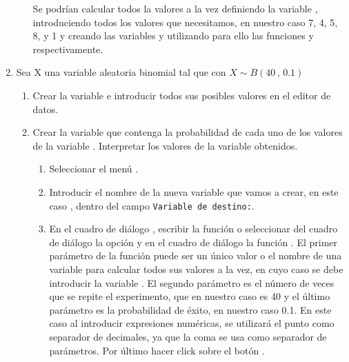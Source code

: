 \begin{enumerate}[leftmargin=*]
\begin{enumerate}
\begin{indicacion}
Se podrían calcular todos la valores a la vez definiendo la
variable , introduciendo todos los valores que
necesitamos, en nuestro caso 7, 4, 5, 8, y 1 y creando las
variables  y 
utilizando para ello las funciones  y 
 respectivamente.
\end{indicacion}

\end{enumerate}

\item Sea X una variable aleatoria binomial tal que con $X\sim B(40\,,\,0.1)$

\begin{enumerate}
\item Crear la variable  e introducir todos sus posibles
valores en el editor de datos.

\item  Crear la variable  que contenga la
probabilidad de cada uno de los valores de la variable .
Interpretar los valores de la variable obtenidos.

\begin{indicacion}
\begin{enumerate}
\item Seleccionar el menú .

\item Introducir el nombre de la nueva variable que vamos a crear,
en este caso , dentro del campo
\texttt{Variable de destino:}.

\item En el cuadro de diálogo ,
escribir la función  o seleccionar del cuadro 
de diálogo  la opción  y en el 
cuadro de diálogo  la 
función . El primer parámetro de la función 
 puede ser
un único valor o el nombre de una variable para calcular todos sus
valores a la vez, en cuyo caso se debe introducir la variable .
El segundo parámetro es el número de veces que se repite el
experimento, que en nuestro caso es 40 y el último parámetro es la
probabilidad de éxito, en nuestro caso 0.1. En este caso al
introducir expresiones numéricas, se utilizará el punto como
separador de decimales, ya que la coma se usa como separador de
parámetros. Por último hacer click sobre el botón
.



\end{enumerate}
\end{indicacion}
\end{enumerate}
\end{enumerate}
